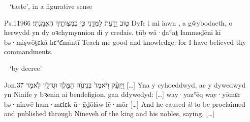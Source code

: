 \begin{frame}{\ex\  ‘taste’, in a figurative sense}
\begin{example}{Ps.}{119}{66}{}{}
	\quoling
	{ט֤וּב  וָדַ֣עַת לַמְּדֵ֑נִי כִּ֖י בְמִצְוֺתֶ֣יךָ הֶאֱמָֽנְתִּי׃}
	{Dyſc i mi iawn , a gŵybodaeth, o herwydd yn dy oꝛchymynnion di y credais.}
	{ṭūḇ  wå·ḏaʿaṯ lamməḏēnī kī ḇə·miṣwōṯɛḵå hɛʾɛ̆måntī}
	{Teach me good  and knowledge: for I have believed thy commandments.}
\end{example}
\end{frame}



\begin{frame}{\ex\  ‘by decree’}
\begin{example}{Jon.}{3}{7}{}{}
	\quoling
	{וַיַּזְעֵ֗ק וַיֹּ֙אמֶר֙ בְּנִֽינְוֵ֔ה  הַמֶּ֛לֶךְ וּגְדֹלָ֖יו לֵאמֹ֑ר […]}
	{Yna y cyhoeddwyd, ac y dywedwyd yn Ninife  y bꝛenin ai bendefigion, gan ddywedyd: […]}
	{way·yazʿēq way·yōmɛr bə·nīnwē  ham·mɛlɛḵ ū·ḡḏōlåw lē·mōr […]}
	{And he caused \textit{it} to be proclaimed and published through Nineveh  of the king and his nobles, saying, […]}
\end{example}
\end{frame}
